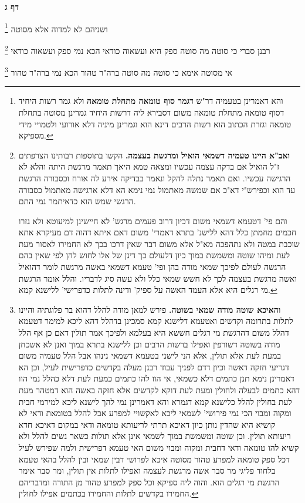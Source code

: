 \documentclass[12pt, openany]{book}
\newcommand{\sethebfont}{
\fontsize{10.5pt}{21.0pt} \selectfont
}
\newcommand{\twocol}[1]{
	{\sethebfont \begin{multicols}{2}
			#1
	\end{multicols}}	
}
\newcommand{\sectname}{}
\newcommand{\newsection}[1]{
	\addcontentsline{toc}{section}{#1}
	\renewcommand{\sectname}{#1}	
	\vspace{-\baselineskip}
	\begin{center}
		\textbf{%
\fontsize{16pt}{16pt}\selectfont
			#1}
	\end{center}
	\vspace{-\baselineskip}
	\nopagebreak
}
\newcommand{\footnotecomment}[1]{\footnote{#1}}
\newcommand{\commenta}[1]{\footnotecomment{#1}}
\begin{document}
\newsection{דף ג}
\twocol{ושניהם לא למדוה אלא מסוטה 
\commenta{והא דאמרינן בטעמיה דר"ש \textbf{דגמר סוף טומאה מתחלת טומאה}  ולא גמר רשות היחיד דסוף טומאה מתחלת טומאה משום דסבירא ליה דרשות היחיד גמרינן מסוטה בתחלת טומאה וגזרת הכתוב הוא רשות הרבים דינא הוא וגמרינן מיניה דלא אורועי ולטמויי מידי מספיקא. }

רבנן סברי  כי סוטה מה סוטה ספק היא ועשאוה כודאי הכא נמי ספק ועשאוה כודאי 
\commenta{\textbf{ואב"א היינו טעמיה דשמאי הואיל ומרגשת בעצמה.}  הקשו בתוספות רבותינו הצרפתים ז"ל הואיל אם בדקה עצמה עכשיו ומצאה טמא היאך תאמר מרגשת היתה והלא לא הרגישה עכשיו. ואם תאמר נתלה להקל ונאמר בבדיקה אירע לה אורח וכסבורה הרגשת עד הוא וכפירש"י דא"כ אם שמשה מאתמול נמי נימא הא דלא ארגישה מאתמול כסבורה הרגשי שמש הוא כדאיתמר נמי התם.\par  והם פי' דטעמא דשמאי משום דכיון דרוב פעמים מרגש' לא חיישינן למיעוטא ולא גזרו חכמים מחמתן כלל דהא ללישנ' בתרא דאמרי' משום דאם איתא דהוה דם מעיקרא אתא שוכבת במטה ולא נתהפכה מא"ל אלא משום דבר שאין דרכו בכך לא החמירו לאסור מעת לעת ומיהו שוטה ומשמשת במוך כיון דלעולם כך דינן של אלו לחוש להן לפי שאין בהם הרגשה לעולם לפיכך שמאי מודה בהן ופי' טעמא דשמאי באשה מרגשת לומר דהואיל ואשה מרגשת בעצמה לכך לא חשש שמאי כלל ולא עשה סיג לדבריו. והלל אומר הרגשת מי רגלים היא אלא העמד האשה על ספיק' ודינה לתלות כדפרישי' ללישנא קמא. }

אי מסוטה אימא כי סוטה מה סוטה ברה"ר טהור הכא נמי ברה"ר טהור 
\commenta{\textbf{והאיכא שוטה מודה שמאי בשוטה.}  פירש למאן מודה להלל דהוא בר פלוגתיה והיינו לתלות בתרומה וקדשים ואטעמא דלישנא קמא סמכינן בדהלל דהא ליכא למימר דטעמא דהלל משום דהרגשת מי רגלים חששא היא בעלמא ולפיכך אמר תולין דאם כן אף הלל מודה בשוטה דשורפין ואפילו ברשות הרבים וכן ללישנא בתרא במוך ואנן לא אשכחן במעת לעת אלא תולין, אלא הני לישני בטעמא דשמאי נינהו אבל הלל טעמיה משום דגריעי חזקה דאשה וכיון דדם לפניך עבוד רבנן מעלה בקדשים כדפרישית לעיל, וכן הא דאמרינן נימא תנן כתמים דלא כשמאי, אי הוו להו כתמים כמעת לעת דלא כהלל נמי הוו דהא כתמים לבעלה ולחולין ומעת לעת דוקא לקדשים אלא חזקה באשה הוא דמטהר מעת לעת בחולין להלל כלישנא קמא דגמרא והא דאמרינן נמי להך לישנא ליכא למירמי חבית ומקוה ומבוי הכי נמי פירושי' לשמאי ליכא לאקשויי למפרע אבל להלל בטומאת ודאי לא קושיא היא שהדין נותן כיון דאיכא תרתי לריעותא טומאה ודאי במקום דאיכא חדא ריעותא תולין. וכן שוטה ומשמשת במוך לשמאי אינן אלא תולות כשאר נשים להלל ולא קשיא להו טומאה ודאי דחבית ומקוה ומבוי משום האי טעמא דפרישית ולמה שפירש לעיל דכל ספק טומאה למפרע טהור מסוטה איכא לפרושי דבין שמאי ובין להלל בהאי טעמא בלחוד פליגי מר סבר אשה מרגשת לעצמה ואפילו לתלות אין תולין, ומר סבר אימר הרגשת מי רגלים הוא. והוה ליה ספיקא וכל ספק למפרע טהור מן התורה ומדבריהם החמירו בקדשים לתלות והחמירו בכתמים אפילו לחולין. }

}
\end{document}
